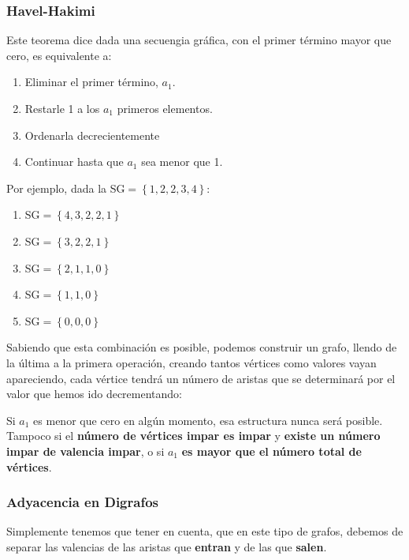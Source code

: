 \subsubsection{Havel-Hakimi}
Este teorema dice dada una secuengia gráfica, con el primer término mayor que cero, es equivalente a:
\begin{enumerate}
        \item Eliminar el primer término, \(a_1\).
        \item Restarle 1 a los \(a_1\) primeros elementos.
        \item Ordenarla decrecientemente
        \item Continuar hasta que \(a_1\) sea menor que 1.
\end{enumerate}
Por ejemplo, dada la SG\(=\left\{1,2,2,3,4\right\} \):
\begin{enumerate}
        \item SG\(=\left\{4,3,2,2,1\right\}\)
        \item SG\(=\left\{3,2,2,1\right\}\)
        \item SG\(=\left\{2,1,1,0\right\}\)
        \item SG\(=\left\{1,1,0\right\}\)
        \item SG\(=\left\{0,0,0\right\}\)
\end{enumerate}
Sabiendo que esta combinación es posible, podemos construir un grafo, llendo de la última a la primera operación, creando tantos vértices como valores vayan apareciendo, cada vértice tendrá un número de aristas que se determinará por el valor que hemos ido decrementando: \par
{}
Si \(a_1\) es menor que cero en algún momento, esa estructura nunca será posible. Tampoco si el \textbf{número de vértices impar es impar} y \textbf{existe un número impar de valencia impar}, o si \(a_1\) \textbf{es mayor que el número total de vértices}.
\subsubsection{Adyacencia en Digrafos}
Simplemente tenemos que tener en cuenta, que en este tipo de grafos, debemos de separar las valencias de las aristas que \textbf{entran} y de las que \textbf{salen}.
